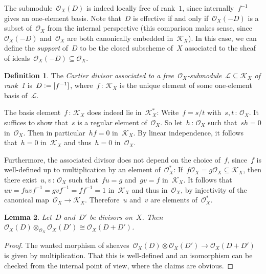 \documentclass[10pt]{amsart}
\theoremstyle{definition}
\newtheorem{defn}{Definition}[section]
\theoremstyle{plain}
\newtheorem{prop}[defn]{Proposition}
\newtheorem{lemma}[defn]{Lemma}
\theoremstyle{remark}
\renewcommand{\O}{\mathcal{O}}
\newcommand{\K}{\mathcal{K}}
\renewcommand{\L}{\mathcal{L}}
\newcommand{\?}{\,{:}\,}
\renewcommand{\_}{\mathpunct{.}\,}
\newcommand{\defeq}{\vcentcolon=}
\begin{document}
The submodule~$\O_X(D)$ is indeed locally free of rank~$1$, since
internally~$f^{-1}$ gives an one-element basis. Note that~$D$ is effective if
and only if~$\O_X(-D)$ is a subset of~$\O_X$ from the internal perspective
(this comparison makes sense, since~$\O_X(-D)$ and~$\O_X$ are both canonically
embedded in~$\K_X$). In
this case, we can define the \emph{support} of~$D$ to be the closed subscheme
of~$X$ associated to the sheaf of ideals~$\O_X(-D) \subseteq \O_X$.


\begin{defn}The \emph{Cartier divisor associated to a free~$\O_X$-submodule~$\L \subseteq
\K_X$ of rank~1} is~$D \defeq [f^{-1}]$, where~$f\?\K_X$ is the unique element of
some one-element basis of~$\L$.\end{defn}

The basis element~$f\?\K_X$ does indeed lie in~$\K_X^*$: Write~$f
= s/t$ with~$s,t \? \O_X$. It suffices to show that~$s$ is a regular element
of~$\O_X$. So let~$h\?\O_X$ such that~$sh = 0$ in~$\O_X$. Then in
particular~$hf = 0$ in~$\K_X$. By linear independence, it follows that~$h = 0$
in~$\K_X$ and thus~$h = 0$ in~$\O_X$.

Furthermore, the associated divisor does not depend on the choice of~$f$,
since~$f$ is well-defined up to multiplication by an element of~$\O_X^*$: If~$f
\O_X = g \O_X \subseteq \K_X$, then there exist~$u,v\?\O_X$ such that~$fu = g$
and~$gv = f$ in~$\K_X$. It follows that~$uv = fuvf^{-1} = gvf^{-1} = ff^{-1} =
1$ in~$\K_X$ and thus in~$\O_X$, by injectivity of the canonical map~$\O_X \to
\K_X$. Therefore~$u$ and~$v$ are elements of~$\O_X^*$.

\begin{lemma}Let~$D$ and~$D'$ be divisors on~$X$. Then~$\O_X(D) \otimes_{\O_X}
\O_X(D') \cong \O_X(D + D')$.\end{lemma}
\begin{proof}The wanted morphism of sheaves~$\O_X(D) \otimes \O_X(D') \to
\O_X(D + D')$ is given by multiplication. That this is well-defined and an
isomorphism can be checked from the internal point of view, where the claims
are obvious.\end{proof}
\end{document}
